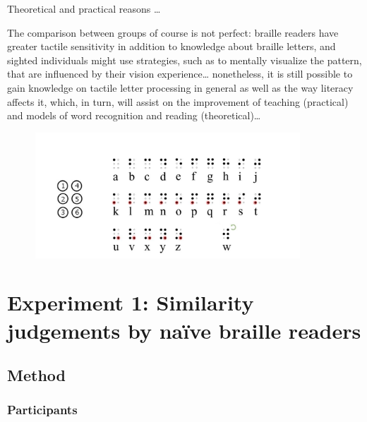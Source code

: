 \documentclass[english,man]{apa7}
\begin{document}
{\colorbox{blue}{\sffamily\scriptsize\bfseries\color{white}{abl}}}{\sffamily\small\itshape\color{blue}{importance}}

Theoretical and practical reasons \ldots{}

{\colorbox{blue}{\sffamily\scriptsize\bfseries\color{white}{abl}}}{\sffamily\small\itshape\color{blue}{limitations on interpretation}}

The comparison between groups of course is not perfect: braille readers have greater tactile sensitivity in addition to knowledge about braille letters, and sighted individuals might use strategies, such as to mentally visualize the pattern, that are influenced by their vision experience\ldots{} nonetheless, it is still possible to gain knowledge on tactile letter processing in general as well as the way literacy affects it, which, in turn, will assist on the improvement of teaching (practical) and models of word recognition and reading (theoretical)\ldots{}

\begin{figure}
\includegraphics[width=3.91in]{FigureBraille_Eng_2} \caption{ }\label{fig:BrailleAlphabet}
\end{figure}

\hypertarget{experiment-1-similarity-judgements-by-nauxefve-braille-readers}{%
\section{Experiment 1: Similarity judgements by naïve braille readers}\label{experiment-1-similarity-judgements-by-nauxefve-braille-readers}}

\hypertarget{method}{%
\subsection{Method}\label{method}}

\hypertarget{participants}{%
\subsubsection{Participants}\label{participants}}
\end{document}

